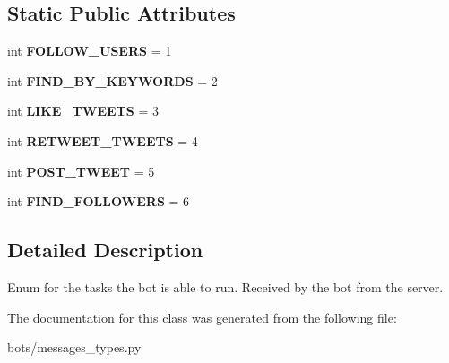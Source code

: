 \subsection*{Static Public Attributes}
\begin{DoxyCompactItemize}
\item 
\mbox{\label{classtwitter_1_1bots_1_1messages__types_1_1ServerToBot_a88d7b857870002d072fe166c5470b57c}} 
int {\bfseries F\+O\+L\+L\+O\+W\+\_\+\+U\+S\+E\+RS} = 1
\item 
\mbox{\label{classtwitter_1_1bots_1_1messages__types_1_1ServerToBot_ab8ff4adb87b0a82e4a4d3a9d4872218f}} 
int {\bfseries F\+I\+N\+D\+\_\+\+B\+Y\+\_\+\+K\+E\+Y\+W\+O\+R\+DS} = 2
\item 
\mbox{\label{classtwitter_1_1bots_1_1messages__types_1_1ServerToBot_ae2b672776672a89efd18c364aa5863e6}} 
int {\bfseries L\+I\+K\+E\+\_\+\+T\+W\+E\+E\+TS} = 3
\item 
\mbox{\label{classtwitter_1_1bots_1_1messages__types_1_1ServerToBot_acc229477b6b55292309f5da7a305dfd0}} 
int {\bfseries R\+E\+T\+W\+E\+E\+T\+\_\+\+T\+W\+E\+E\+TS} = 4
\item 
\mbox{\label{classtwitter_1_1bots_1_1messages__types_1_1ServerToBot_a3b4fe80ad0c9c0ff7877174cab41fa97}} 
int {\bfseries P\+O\+S\+T\+\_\+\+T\+W\+E\+ET} = 5
\item 
\mbox{\label{classtwitter_1_1bots_1_1messages__types_1_1ServerToBot_ac1549a314813b403ecda2b7ead3c56c6}} 
int {\bfseries F\+I\+N\+D\+\_\+\+F\+O\+L\+L\+O\+W\+E\+RS} = 6
\end{DoxyCompactItemize}


\subsection{Detailed Description}
\begin{DoxyVerb}Enum for the tasks the bot is able to run. Received by the bot from the server.
\end{DoxyVerb}
 

The documentation for this class was generated from the following file\+:\begin{DoxyCompactItemize}
\item 
bots/messages\+\_\+types.\+py\end{DoxyCompactItemize}
